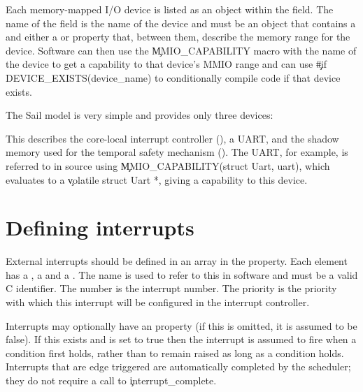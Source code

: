 Each memory-mapped I/O device is listed as an object within the  field.
The name of the field is the name of the device and must be an object that contains a  and either a  or  property that, between them, describe the memory range for the device.
Software can then use the \c{MMIO_CAPABILITY} macro with the name of the device to get a capability to that device's MMIO range and can use \c{#if DEVICE_EXISTS(device_name)} to conditionally compile code if that device exists.

The Sail model is very simple and provides only three devices:

\begin{jsonsnippet}
    "devices": {
        "clint": {
            "start": 0x2000000,
            "length": 0x10000
        \},
        "uart": {
            "start": 0x10000000,
            "end":   0x10000100
        \},
        "shadow" : {
            "start" : 0x83000000,
            "end"   : 0x83001000
        \}
    \},
\end{jsonsnippet}

This describes the core-local interrupt controller (), a UART, and the shadow memory used for the temporal safety mechanism ().
The UART, for example, is referred to in source using \c{MMIO_CAPABILITY(struct Uart, uart)}, which evaluates to a \c{volatile struct Uart *}, giving a capability to this device.

\section{Defining interrupts}

External interrupts should be defined in an array in the  property.
Each element has a , a  and a .
The name is used to refer to this in software and must be a valid C identifier.
The number is the interrupt number.
The priority is the priority with which this interrupt will be configured in the interrupt controller.

Interrupts may optionally have an  property (if this is omitted, it is assumed to be false).
If this exists and is set to true then the interrupt is assumed to fire when a condition first holds, rather than to remain raised as long as a condition holds.
Interrupts that are edge triggered are automatically completed by the scheduler; they do not require a call to \c{interrupt_complete}.

